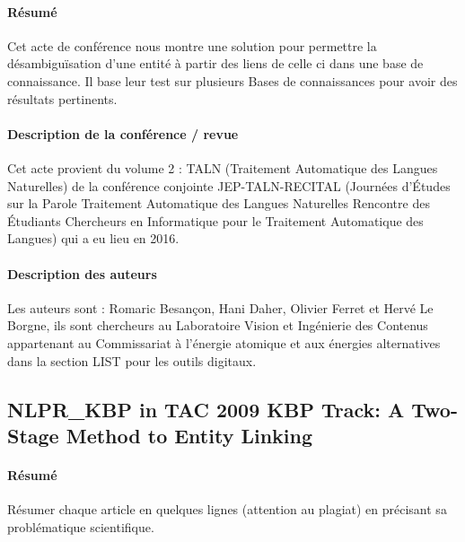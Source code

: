 \documentclass{article}
\begin{document}
\paragraph{Résumé}

Cet acte de conférence nous montre une solution pour permettre la désambiguïsation d'une entité à partir des liens de celle ci dans une base de connaissance. Il base leur test sur plusieurs Bases de connaissances pour avoir des résultats pertinents.


\paragraph{Description de la conférence / revue}

Cet acte provient du volume 2 : TALN (Traitement Automatique des Langues Naturelles) de la conférence conjointe JEP-TALN-RECITAL (Journées d’Études sur la Parole Traitement Automatique des Langues Naturelles Rencontre des Étudiants Chercheurs en Informatique pour le Traitement Automatique des Langues) qui a eu lieu en 2016.


\paragraph{Description des auteurs}

Les auteurs sont : Romaric Besançon, Hani Daher, Olivier Ferret et Hervé Le Borgne, ils sont chercheurs au Laboratoire Vision et Ingénierie des Contenus appartenant au Commissariat à l'énergie atomique et aux énergies alternatives dans la section LIST pour les outils digitaux.

\subsection{NLPR\_KBP in TAC 2009 KBP Track: A Two-Stage Method to Entity Linking\cite{article-10}}

\paragraph{Résumé}

Résumer chaque article en quelques lignes (attention au plagiat)
en précisant sa problématique scientifique.


\end{document}
